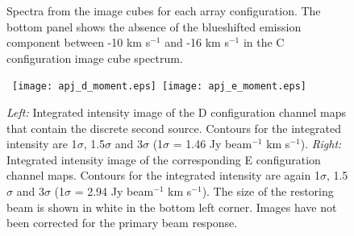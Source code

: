 \documentclass[manuscript]{aastex}
\begin{document}
\clearpage

\begin{figure}
{}
\caption{Spectra from the image cubes for each array configuration. The bottom panel shows the absence of the blueshifted emission component between -10 km s${}^{-1}$ and -16 km s${}^{-1}$ in the C configuration image cube spectrum.\label{fig1}}
\label{fig:fig1}
\end{figure}

\clearpage
\begin{figure}
\mbox{
          \texttt{[image: apj\_d\_moment.eps]}
          \texttt{[image: apj\_e\_moment.eps]}
         }
\caption{\textit{Left:} Integrated intensity image of the D configuration channel maps that contain the discrete second source. Contours for the integrated intensity are 1$\sigma$, 1.5$\sigma$ and 3$\sigma$ (1$\sigma$ = 1.46 Jy beam${}^{-1}$ km s${}^{-1}$). \textit{Right:} Integrated intensity image of the corresponding E configuration channel maps. Contours for the integrated intensity are again 1$\sigma$, 1.5$\sigma$ and 3$\sigma$ (1$\sigma$ = 2.94 Jy beam${}^{-1}$ km s${}^{-1}$). The size of the restoring beam is shown in white in the bottom left corner. Images have not been corrected for the primary beam response.}
\label{fig:fig2}
\end{figure}


\clearpage
\end{document}
